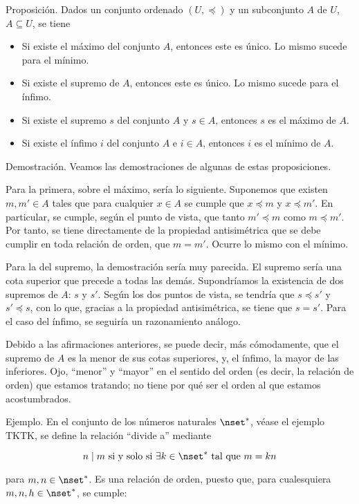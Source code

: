 Proposición. Dados un conjunto ordenado $(U, \preceq)$ y un subconjunto $A$
de $U$, $A \subseteq U$, se tiene

\begin{itemize}
  \item Si existe el máximo del conjunto $A$, entonces este es único. Lo
    mismo sucede para el mínimo.
  \item Si existe el supremo de $A$, entonces este es único. Lo mismo sucede
    para el ínfimo.
  \item Si existe el supremo $s$ del conjunto $A$ y $s \in A$, entonces $s$
    es el máximo de $A$.
  \item Si existe el ínfimo $i$ del conjunto $A$ e $i \in A$, entonces $i$
    es el mínimo de $A$.
\end{itemize}

Demostración. Veamos las demostraciones de algunas de estas proposiciones.

Para la primera, sobre el máximo, sería lo siguiente. Suponemos que existen
$m, m' \in A$ tales que para cualquier $x \in A$ se cumple que $x \preceq m$
y $x \preceq m'$. En particular, se cumple, según el punto de vista, que
tanto $m' \preceq m$ como $m \preceq m'$. Por tanto, se tiene directamente
de la propiedad antisimétrica que se debe cumplir en toda relación de orden,
que $m = m'$. Ocurre lo mismo con el mínimo.

Para la del supremo, la demostración sería muy parecida. El supremo sería
una cota superior que precede a todas las demás. Supondríamos la existencia
de dos supremos de $A$: $s$ y $s'$. Según los dos puntos de vista, se
tendría que $s \preceq s'$ y $s' \preceq s$, con lo que, gracias a la
propiedad antisimétrica, se tiene que $s = s'$. Para el caso del ínfimo, se
seguiría un razonamiento análogo.

Debido a las afirmaciones anteriores, se puede decir, más cómodamente, que
el supremo de $A$ es la menor de sus cotas superiores, y, el ínfimo, la
mayor de las inferiores. Ojo, ``menor'' y ``mayor'' en el sentido del orden
(es decir, la relación de orden) que estamos tratando; no tiene por qué ser
el orden al que estamos acostumbrados.

Ejemplo. En el conjunto de los números naturales $\nset^*$, véase el ejemplo
TKTK, se define la relación ``divide a'' mediante

$$ n \mid m \ \text{si y solo si} \ \exists k \in \nset^* \ \text{tal que} \
m = kn $$

\noindent para $m, n \in \nset^*$. Es una relación de orden, puesto que,
para cualesquiera $m, n, h \in \nset^*$, se cumple:

